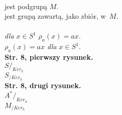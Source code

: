 \documentclass[a4paper,11pt]{article}
\begin{document}
\noindent
{} \\
\Jest  jest podgrupą $M$. \\
\Powin jest grupą zawartą, jako zbiór, w~$M$. \\
 \\
\Jest  \textit{dla} $x \in S^{ 1 }$ $\rho_{ a }( x )= a x$. \\
\Powin $\rho_{ a }( x ) = a x$ \textit{dla} $x \in S^{ 1 }$. \\
\textbf{Str. 8, pierwszy rysunek.} \\
\Jest  $S /_{ Ker_{ h } }$ \\
\Powin $S_{ / Ker_{ h } }$ \\
\textbf{Str. 8, drugi rysunek.} \\
\Jest  $A^{ * } /_{ Ker_{ h } }$ \\
\Powin $M_{ / Ker_{ h } }$ \\


\vspace{\spaceTwo}












{}






\end{document}
